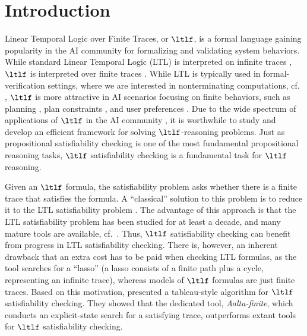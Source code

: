 \section{Introduction}\label{sec:intro}

Linear Temporal Logic over Finite Traces, or $\ltlf$, is a formal language gaining popularity in the AI community for formalizing and validating system behaviors. While standard Linear Temporal Logic (LTL) is interpreted on infinite traces \cite{Pnu77}, $\ltlf$ is interpreted over finite traces \cite{GV13}.  While LTL is typically used in formal-verification settings, where we are interested in nonterminating computations, cf. \cite{Var07a},  $\ltlf$ is more attractive in AI scenarios focusing on finite behaviors, such as planning \cite{BK98,DV99,CDV02,PLGG11,CBMM17}, plan constraints \cite{BK00,Gab04}, and user preferences \cite{BFM06,BFM11,SBM11}. Due to the wide spectrum of applications of $\ltlf$ in the AI community \cite{DMM14}, it is worthwhile to study and develop an efficient framework for solving $\ltlf$-reasoning problems. Just as propositional satisfiability checking is one of the most fundamental propositional reasoning tasks, $\ltlf$ satisfiability checking is a fundamental task for $\ltlf$ reasoning. 

Given an $\ltlf$ formula, the satisfiability problem asks whether there is a finite trace that satisfies the formula. A ``classical'' solution to this problem is to reduce it to the LTL satisfiability problem \cite{GV13}. The advantage of this approach is that the LTL satisfiability problem has been studied for at least a decade, and many mature tools are available, cf.~\cite{RV07,RV12}. Thus, $\ltlf$ satisfiability checking can benefit from progress in LTL satisfiability checking. There is, however, an inherent drawback that an extra cost has to be paid when checking LTL formulas, as the tool searches for a ``lasso'' (a lasso consists of a finite path plus a cycle, representing an infinite trace), whereas models of $\ltlf$ formulas are just finite traces. Based on this motivation, \cite{LZPVH14} presented a tableau-style algorithm for $\ltlf$ satisfiability checking. They showed that the dedicated tool, \emph{Aalta-finite}, which conducts an explicit-state search for a satisfying trace, outperforms extant tools for $\ltlf$ satisfiability checking. 


